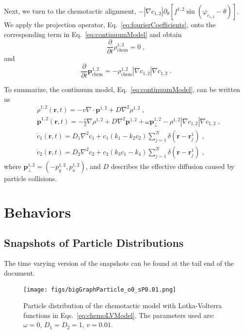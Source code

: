 \documentclass{article}
\begin{document}
Next, we turn to the chemotactic alignment, $-\left| \nabla c_{1,2} \right|\partial _{\theta}\left[ f ^{1,2}\sin \left( \varphi _{c_{1,2}}-\theta \right) \right]$. We apply the projection operator, Eq.~\eqref{eq:fourierCoefficients}, onto the corresponding term in Eq.~\eqref{eq:continuumModel} and obtain
\begin{equation}
    \frac{\partial}{\partial t}\rho _{\mathrm{chem}}^{1,2}=0\;,
\end{equation}
and
\begin{equation}
    \frac{\partial}{\partial t}\boldsymbol{p}_{\mathrm{chem}}^{1,2}=-\rho _{\mathrm{chem}}^{1,2}\left| \nabla c_{1,2} \right|\nabla c_{1,2}\;.
\end{equation}

To summarize, the continuum model, Eq.~\eqref{eq:continuumModel}, can be written as
\begin{subequations}
    \begin{align}
        &\dot{\rho}^{1,2}\left( \mathbf{r},t \right) =-v\nabla \cdot \boldsymbol{p}^{1,2}+D\nabla ^2\rho ^{1,2}\;,\\
        &\dot{\boldsymbol{p}}^{1,2}\left( \mathbf{r},t \right) =-\frac{v}{2}\nabla \rho ^{1,2}+D\nabla ^2\boldsymbol{p}^{1,2}+\omega \boldsymbol{p}_{\bot}^{1,2}-\rho ^{1,2}\left| \nabla c_{1,2} \right|\nabla c_{1,2}\;,\\
        &\dot{c}_1\left( \mathbf{r},t \right) =D_1\nabla ^2c_1+c_1\left( k_1-k_2c_2 \right) \sum_{j=1}^N{\delta \left( \mathbf{r}-\mathbf{r}_{j}^{1} \right) \;,}\\
        &\dot{c}_2\left( \mathbf{r},t \right) =D_2\nabla ^2c_2+c_2\left( k_3c_1-k_4 \right) \sum_{j=1}^N{\delta \left( \mathbf{r}-\mathbf{r}_{j}^{1} \right) \;,}
    \end{align}
\end{subequations}
where $\boldsymbol{p}_{\bot}^{1,2}=\left( -p_{y}^{1,2},p_{x}^{1,2} \right)$, and $D$ describes the effective diffusion caused by particle collisions.

\newpage
\section{Behaviors}
\subsection{Snapshots of Particle Distributions}
The time varying version of the snapshots can be found at the tail end of the document. 
\begin{figure}[H]
    \centering
    \texttt{[image: figs/bigGraphParticle\_o0\_sP0.01.png]}
    \caption{
        Particle distribution of the chemotactic model with Lotka-Volterra functions in Eqs.~\eqref{eq:chemoLVModel}. The parameters used are: $\omega=0$, $D_1=D_2=1$, $v=0.01$.
    }
\end{figure}
\end{document}
